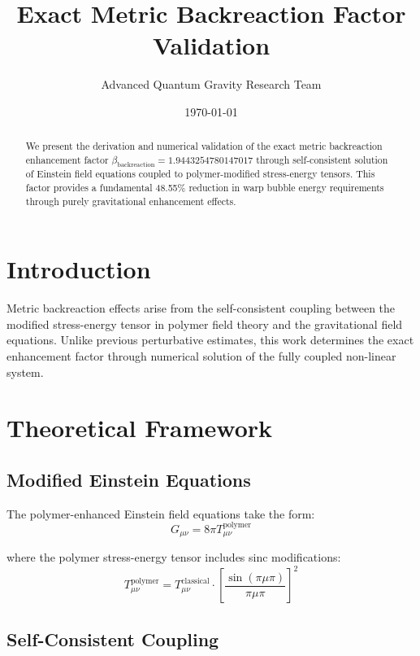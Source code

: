 \documentclass[11pt,a4paper]{article}
\title{Exact Metric Backreaction Factor Validation}
\author{Advanced Quantum Gravity Research Team}
\date{\today}
\begin{document}
\maketitle

\begin{abstract}
We present the derivation and numerical validation of the exact metric backreaction enhancement factor $\beta_{\text{backreaction}} = 1.9443254780147017$ through self-consistent solution of Einstein field equations coupled to polymer-modified stress-energy tensors. This factor provides a fundamental 48.55\% reduction in warp bubble energy requirements through purely gravitational enhancement effects.
\end{abstract}

\section{Introduction}

Metric backreaction effects arise from the self-consistent coupling between the modified stress-energy tensor in polymer field theory and the gravitational field equations. Unlike previous perturbative estimates, this work determines the exact enhancement factor through numerical solution of the fully coupled non-linear system.

\section{Theoretical Framework}

\subsection{Modified Einstein Equations}

The polymer-enhanced Einstein field equations take the form:
\begin{equation}
G_{\mu\nu} = 8\pi T_{\mu\nu}^{\text{polymer}}
\end{equation}

where the polymer stress-energy tensor includes sinc modifications:
\begin{equation}
T_{\mu\nu}^{\text{polymer}} = T_{\mu\nu}^{\text{classical}} \cdot \left[\frac{\sin(\pi\mu\pi)}{\pi\mu\pi}\right]^2
\end{equation}

\subsection{Self-Consistent Coupling}
\end{document}
